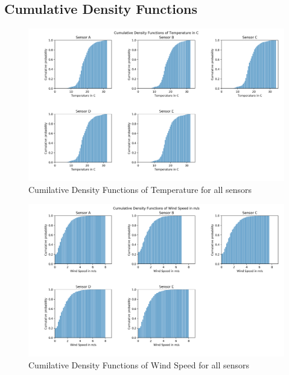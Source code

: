 \documentclass{article}
\begin{document}
    \subsection{Cumulative Density Functions}
        \begin{figure}[H]
            \includegraphics[width=\textwidth]{cdf_temp}
            \caption{Cumilative Density Functions of Temperature for all sensors}
        \end{figure}

        \begin{figure}[H]
            \includegraphics[width=\textwidth]{cdf_windspeed}
            \caption{Cumilative Density Functions of Wind Speed for all sensors}
        \end{figure}
\end{document}
